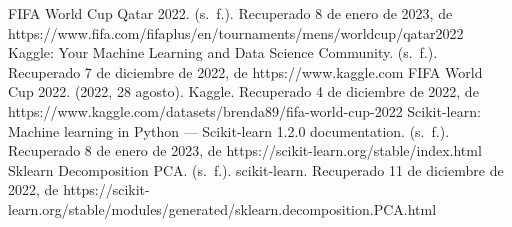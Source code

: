 \begin{thebibliography}{X}
     FIFA World Cup Qatar 2022. (s. f.). Recuperado 8 de enero de 2023, de https://www.fifa.com/fifaplus/en/tournaments/mens/worldcup/qatar2022
     Kaggle: Your Machine Learning and Data Science Community. (s. f.). Recuperado 7 de diciembre de 2022, de https://www.kaggle.com
     FIFA World Cup 2022. (2022, 28 agosto). Kaggle. Recuperado 4 de diciembre de 2022, de https://www.kaggle.com/datasets/brenda89/fifa-world-cup-2022
     Scikit-learn: Machine learning in Python — Scikit-learn 1.2.0 documentation. (s. f.). Recuperado 8 de enero de 2023, de https://scikit-learn.org/stable/index.html
     Sklearn Decomposition PCA. (s. f.). scikit-learn. Recuperado 11 de diciembre de 2022, de https://scikit-learn.org/stable/modules/generated/sklearn.decomposition.PCA.html
\end{thebibliography}

\newpage